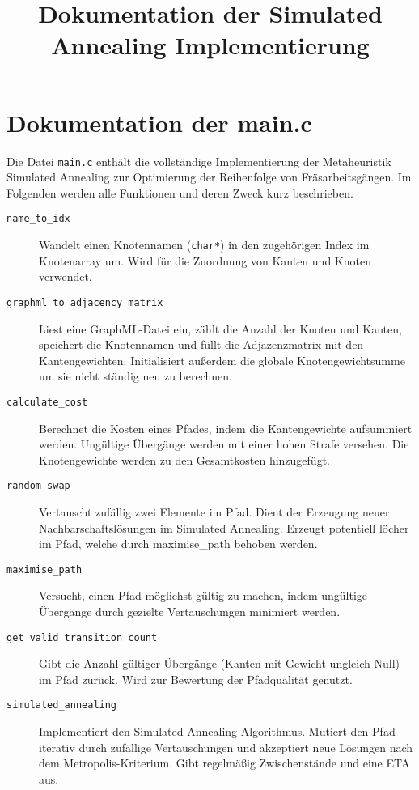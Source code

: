 \documentclass{article}
\begin{document}
\title{Dokumentation der Simulated Annealing Implementierung}
\maketitle

\section*{Dokumentation der main.c}

Die Datei \texttt{main.c} enthält die vollständige Implementierung der Metaheuristik Simulated Annealing zur Optimierung der Reihenfolge von Fräsarbeitsgängen. Im Folgenden werden alle Funktionen und deren Zweck kurz beschrieben.

\begin{description}
    \item[\texttt{name\_to\_idx}] Wandelt einen Knotennamen (\texttt{char*}) in den zugehörigen Index im Knotenarray um. Wird für die Zuordnung von Kanten und Knoten verwendet.
    \item[\texttt{graphml\_to\_adjacency\_matrix}] Liest eine GraphML-Datei ein, zählt die Anzahl der Knoten und Kanten, speichert die Knotennamen und füllt die Adjazenzmatrix mit den Kantengewichten. Initialisiert außerdem die globale Knotengewichtsumme um sie nicht ständig neu zu berechnen.
    \item[\texttt{calculate\_cost}] Berechnet die Kosten eines Pfades, indem die Kantengewichte aufsummiert werden. Ungültige Übergänge werden mit einer hohen Strafe versehen. Die Knotengewichte werden zu den Gesamtkosten hinzugefügt.
    \item[\texttt{random\_swap}] Vertauscht zufällig zwei Elemente im Pfad. Dient der Erzeugung neuer Nachbarschaftslösungen im Simulated Annealing. Erzeugt potentiell löcher im Pfad, welche durch maximise\_path behoben werden.
    \item[\texttt{maximise\_path}] Versucht, einen Pfad möglichst gültig zu machen, indem ungültige Übergänge durch gezielte Vertauschungen minimiert werden.
    \item[\texttt{get\_valid\_transition\_count}] Gibt die Anzahl gültiger Übergänge (Kanten mit Gewicht ungleich Null) im Pfad zurück. Wird zur Bewertung der Pfadqualität genutzt.
    \item[\texttt{simulated\_annealing}] Implementiert den Simulated Annealing Algorithmus. Mutiert den Pfad iterativ durch zufällige Vertauschungen und akzeptiert neue Lösungen nach dem Metropolis-Kriterium. Gibt regelmäßig Zwischenstände und eine ETA aus.

\end{description}
\end{document}
